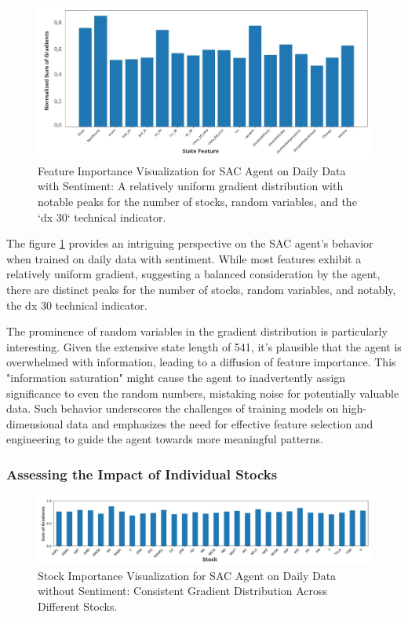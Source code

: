 \documentclass[12pt]{article}
\begin{document}
\begin{figure}[h]
\centering
\includegraphics[width=1\textwidth]{figs/FeatureImportance_Sentiment_SAC_daily.jpg}
\caption{Feature Importance Visualization for SAC Agent on Daily Data with Sentiment: A relatively uniform gradient distribution with notable peaks for the number of stocks, random variables, and the `dx 30` technical indicator.}
\label{fig:FeatureImportance_Sentiment_SAC_daily}
\end{figure}


The figure \ref{fig:FeatureImportance_Sentiment_SAC_daily} provides an intriguing perspective on the SAC agent's behavior when trained on daily data with sentiment. While most features exhibit a relatively uniform gradient, suggesting a balanced consideration by the agent, there are distinct peaks for the number of stocks, random variables, and notably, the dx 30 technical indicator.

The prominence of random variables in the gradient distribution is particularly interesting. Given the extensive state length of 541, it's plausible that the agent is overwhelmed with information, leading to a diffusion of feature importance. This "information saturation" might cause the agent to inadvertently assign significance to even the random numbers, mistaking noise for potentially valuable data. Such behavior underscores the challenges of training models on high-dimensional data and emphasizes the need for effective feature selection and engineering to guide the agent towards more meaningful patterns.

\subsubsection{Assessing the Impact of Individual Stocks}
\begin{figure}[h]
\centering
\includegraphics[width=1\textwidth]{figs/Stock_Importance_SAC_daily.jpg}
\caption{Stock Importance Visualization for SAC Agent on Daily Data without Sentiment: Consistent Gradient Distribution Across Different Stocks.}
\label{fig:StockImportance_SAC_daily}
\end{figure}
\end{document}
